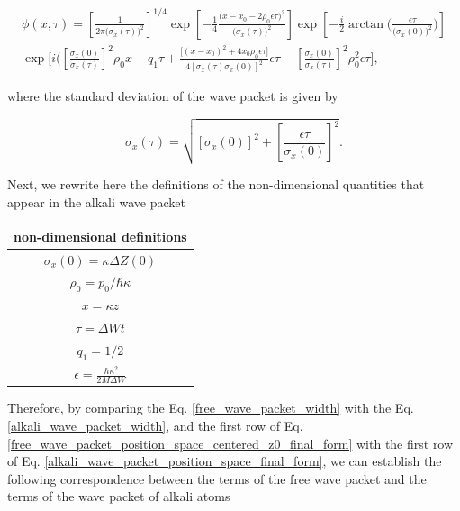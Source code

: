 \documentclass{article}
\begin{document}
\begin{multline}\label{alkali_wave_packet_position_space_final_form} 
    \phi (x, \tau) = \left[\frac{1}{2 \pi \big(\sigma_{x}(\tau)\big)^2} \right]^{1/4} \exp \left[-\frac{1}{4} \frac{ \big(x - x_{0} - 2\rho_{0} \epsilon \tau \big)^{2}}{\big(\sigma_{x}(\tau)\big)^{2}} \right] \exp \left[-\frac{i}{2} \arctan\Bigg(\frac{\epsilon \tau}{\big(\sigma_{x}(0)\big)^{2}}\Bigg) \right] \\ \exp \Bigg[i \bigg(\left[\frac{\sigma_{x}(0)}{\sigma_{x}(\tau)} \right]^{2} \rho_{0}x - q_{1}\tau + \frac{\big[(x-x_{0})^{2} + 4 x_{0} \rho_{0} \epsilon \tau \big]}{ 4[\sigma_{x}(\tau)\sigma_{x}(0)]^{2}} \epsilon \tau - \left[\frac{\sigma_{x}(0)}{\sigma_{x}(\tau)} \right]^{2} \rho_{0}^{2} \epsilon \tau \Bigg],
\end{multline}

where the standard deviation of the wave packet is given by

\begin{equation}\label{alkali_wave_packet_width} 
\sigma_{x}(\tau) = \sqrt{[\sigma_{x}(0)]^{2} + \left[\frac{\epsilon \tau}{\sigma_{x}(0)} \right]^{2}}.
\end{equation}

Next, we rewrite here the definitions of the non-dimensional quantities that appear in the alkali wave packet

\begin{center}
\begin{tabular}{||c ||} 
 \hline
 non-dimensional definitions \\ [0.5ex] 
 \hline\hline
 $\sigma_{x}(0) = \kappa \Delta Z(0)$ \\ 
 \hline
 $\rho_{0} = p_{0} / \hbar \kappa$\\
 \hline
 $x = \kappa z$\\
 \hline
 $\tau = \Delta W t$\\
 \hline
 $q_{1} = 1/2$\\
 \hline
 $\epsilon = \frac{\hbar \kappa^{2}}{2 M \Delta W}$\\ [1ex] 
 \hline
\end{tabular}
\end{center}

Therefore, by comparing the Eq. \ref{free_wave_packet_width} with the Eq. \ref{alkali_wave_packet_width}, and the first row of Eq. \ref{free_wave_packet_position_space_centered_z0_final_form} with the first row of Eq. \ref{alkali_wave_packet_position_space_final_form}, we can establish the following correspondence between the terms of the free wave packet and the terms of the wave packet of alkali atoms
\end{document}

